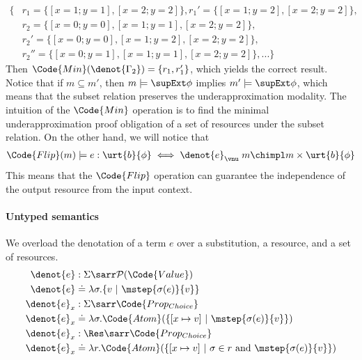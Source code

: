 \begin{align*}
  \{&r_1 = \{[x = 1;y = 1], [x = 2;y = 2]\}, r_1' = \{[x = 1;y = 2], [x = 2;y = 2]\},\\
    &r_2 = \{[x = 0;y = 0], [x = 1;y = 1], [x = 2;y = 2]\}, \\ 
    &r_2' = \{[x = 0;y = 0], [x = 1;y = 2], [x = 2;y = 2]\},\\
    &r_2'' = \{[x = 0;y = 1], [x = 1;y = 1], [x = 2;y = 2]\}, ... \}
\end{align*}\noindent
Then $\Code{Min}(\denot{\Gamma_2}) = \{r_1, r_1'\}$, which yields the correct result.
Notice that if $m \subseteq m'$, then $m \models \supExt \phi$ implies $m' \models \supExt \phi$, which means that the subset relation preserves the underapproximation modality.
The intuition of the $\Code{Min}$ operation is to find the minimal underapproximation proof obligation of a set of resources under the subset relation. On the other hand, we will notice that
\begin{align*}
  \Code{Flip}(m) \models e : \urt{b}{\phi} \iff \denot{e}_\vnu\;m \chimpl m \times \urt{b}{\phi}
\end{align*}\noindent
This means that the $\Code{Flip}$ operation can guarantee the independence of the output resource from the input context.

\paragraph{Untyped semantics} We overload the denotation of a term $e$ over a substitution, a resource, and a set of resources.
\begin{align*}
  \denot{e} &: \Sigma \sarr \mathcal{P}(\Code{Value})
  \\\denot{e} &\doteq \lambda \sigma. \{v ~|~  \mstep{\sigma(e)}{v}  \}
  \\\denot{e}_x &: \Sigma \sarr \Code{Prop_{Choice}}
  \\\denot{e}_x &\doteq \lambda \sigma. \Code{Atom}(\{[x \mapsto v] ~|~ \mstep{\sigma(e)}{v}  \})
  \\\denot{e}_x &: \Res \sarr \Code{Prop_{Choice}}
  \\\denot{e}_x &\doteq \lambda r. \Code{Atom}(\{[x \mapsto v] ~|~ \sigma \in r \text{ and } \mstep{\sigma(e)}{v}  \})
\end{align*}\noindent

